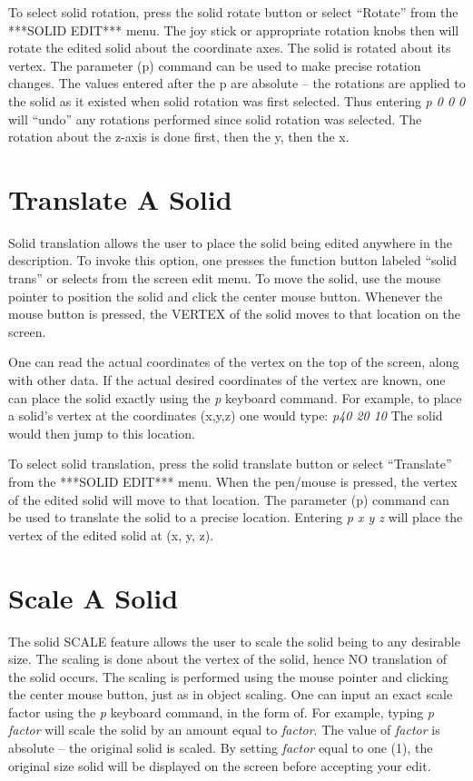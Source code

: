To select solid rotation, press the solid rotate button or select ``Rotate''
from the ***SOLID EDIT*** menu.
The joy stick or appropriate rotation knobs then will rotate the edited solid
about the coordinate axes.
The solid is rotated about its vertex.
The parameter (p) command can be used to make precise rotation changes.
The values entered after the p are absolute -- the rotations are applied
to the solid as it existed when solid rotation was first selected.
Thus entering {\em p 0 0 0} will ``undo'' any rotations performed since
solid rotation was selected.
The rotation about the z-axis is done first, then the y, then the x.

\section{Translate A Solid}

Solid translation allows the user to place the solid being edited anywhere
in the description.  To invoke this option, one presses the function
button labeled ``solid trans'' or selects from the screen edit
menu.  To move the solid, use the mouse pointer to position the solid and
click the center mouse button.  Whenever the mouse button is pressed, the
VERTEX of the solid moves to that location on the screen.

One can read the actual coordinates of the vertex on the top of the
screen, along with other data.  If the actual desired coordinates of the
vertex are known, one can place the solid exactly using the {\em p} keyboard
command.  For example, to place a solid's vertex at the coordinates (x,y,z)
one would type:
{\em \center
p40 20 10
}
The solid would then jump to this location.

To select solid translation, press the solid translate button or
select ``Translate'' from the ***SOLID EDIT*** menu.
When the pen/mouse is pressed, the vertex of the edited solid will
move to that location.
The parameter (p) command can be used to translate the solid to
a precise location.
Entering {\em p x y z} will place the vertex of the edited solid at (x, y, z).

\section{Scale A Solid}

The solid SCALE feature allows the user to scale the solid being to any
desirable size.  The scaling is done about the vertex of the solid, hence NO
translation of the solid occurs.  The scaling is performed using the mouse
pointer and clicking the center mouse button, just as in object scaling.  One
can input an exact scale factor using the {\em p} keyboard command, in the form
of.  For example, typing
{\em \center
p factor
}
will scale the solid by an amount equal to {\em factor}.   The value of
{\em factor} is absolute -- the original solid is scaled.  By setting {\em factor}
equal to one (1), the original size solid will be displayed on the screen
before accepting your edit.

